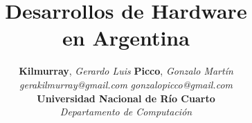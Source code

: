 \documentclass[%
 	final,
%
	notitlepage,
	narroweqnarray,
	inline,
 	twoside,
	]{ieee}
\begin{document}
\onecolumn
\title[Hardware en Argentina]{\sffamily \textbf{Desarrollos de Hardware \\en Argentina}}
\author{\textbf{Kilmurray}, \textit{Gerardo Luis} \hspace{4cm} \textbf{Picco}, \textit{Gonzalo Mart\'in}\\
        \small{\textit{gerakilmurray@gmail.com}}  \hspace{5.5cm}  \small{\textit{gonzalopicco@gmail.com}} \\ [0.5cm] 
	\large \textbf{Universidad Nacional de R\'io Cuarto}\\ \textit{Departamento de Computaci\'on}\\[1cm]
	} 




\maketitle 
\sloppy
\end{document}
